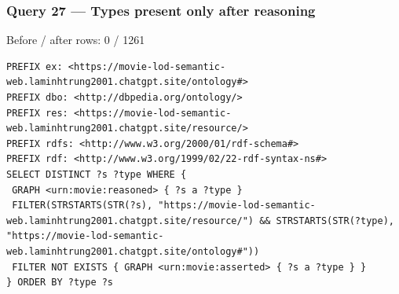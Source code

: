 \documentclass[
  11pt,
]{article}
\begin{document}
\subsubsection{Query 27 --- Types present only after
reasoning}\label{query-27-types-present-only-after-reasoning}

Before / after rows: 0 / 1261

\begin{verbatim}
PREFIX ex: <https://movie-lod-semantic-web.laminhtrung2001.chatgpt.site/ontology#>
PREFIX dbo: <http://dbpedia.org/ontology/>
PREFIX res: <https://movie-lod-semantic-web.laminhtrung2001.chatgpt.site/resource/>
PREFIX rdfs: <http://www.w3.org/2000/01/rdf-schema#>
PREFIX rdf: <http://www.w3.org/1999/02/22-rdf-syntax-ns#>
SELECT DISTINCT ?s ?type WHERE {
 GRAPH <urn:movie:reasoned> { ?s a ?type }
 FILTER(STRSTARTS(STR(?s), "https://movie-lod-semantic-web.laminhtrung2001.chatgpt.site/resource/") && STRSTARTS(STR(?type), "https://movie-lod-semantic-web.laminhtrung2001.chatgpt.site/ontology#"))
 FILTER NOT EXISTS { GRAPH <urn:movie:asserted> { ?s a ?type } }
} ORDER BY ?type ?s
\end{verbatim}
\end{document}
